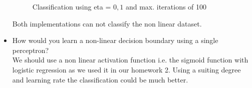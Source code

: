 \documentclass{article}
\begin{document}
\begin{itemize}
	\begin{figure}[!ht]
	\caption{Classification using eta = $0,1$ and max. iterations of 100}
	\label{perceptron2}
	\end{figure}

    Both implementations can not classify the non linear dataset.\\
    
    \item How would you learn a non-linear decision boundary using a single perceptron?\\
    
    We should use a non linear activation function i.e. the sigmoid function with logistic regression as we used it in our homework 2. Using a suiting degree and learning rate  the classification could be much better.
	
	
\end{itemize}
\end{document}
